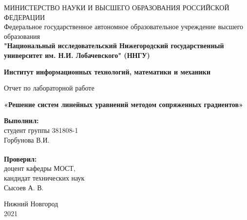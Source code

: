 \documentclass{report}
\begin{document}
\begin{titlepage}

\begin{center}
МИНИСТЕРСТВО НАУКИ И ВЫСШЕГО ОБРАЗОВАНИЯ РОССИЙСКОЙ ФЕДЕРАЦИИ\\
Федеральное государственное автономное образовательное учреждение высшего образования \\
\textbf{"Национальный исследовательский Нижегородский государственный университет им. Н.И. Лобачевского" (ННГУ)}
\end{center}

\begin{center}
\textbf{Институт информационных технологий, математики и механики}
\end{center}

\vspace{4em}

\begin{center}
Отчет по лабораторной работе \\
\end{center}
\begin{center}
\textbf{\Large«Решение систем линейных уравнений методом сопряженных градиентов»} \\
\end{center}

\vspace{4em}

\newbox{\lbox}
\newlength{\maxl}
\setlength{\maxl}{\wd\lbox}
\hfill\parbox{7cm}{
\hspace*{5cm}\hspace*{-5cm}\textbf{Выполнил:} \\ студент группы 381808-1 \\ Горбунова В.И.\\
\\
\hspace*{5cm}\hspace*{-5cm}\textbf{Проверил:}\\ доцент кафедры МОСТ, \\ кандидат технических наук \\ Сысоев А. В.\\
}
\vspace{\fill}

\begin{center} Нижний Новгород \\ 2021 \end{center}

\end{titlepage}
\end{document}
